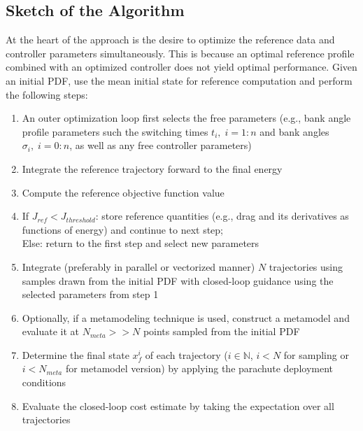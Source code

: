 \documentclass[10pt,a4paper]{article}
\begin{document}
	\subsection{Sketch of the Algorithm}
	At the heart of the approach is the desire to optimize the reference data and controller parameters simultaneously. This is because an optimal reference profile combined with an optimized controller does not yield optimal performance. Given an initial PDF, use the mean initial state for reference computation and perform the following steps:
	\begin{enumerate}
		\item An outer optimization loop first selects the free parameters (e.g., bank angle profile parameters such the switching times $t_i,\;i=1:n$ and bank angles $\sigma_i,\;i=0:n$, as well as any free controller parameters)
		\item Integrate the reference trajectory forward to the final energy
		\item Compute the reference objective function value
		\item If $ J_{ref} < J_{threshold} $: store reference quantities (e.g., drag and its derivatives as functions of energy) and continue to next step;\\
		Else: return to the first step and select new parameters
		\item Integrate (preferably in parallel or vectorized manner) $ N $ trajectories using samples drawn from the initial PDF with closed-loop guidance using the selected parameters from step 1
		\item Optionally, if a metamodeling technique is used, construct a metamodel and evaluate it at $N_{meta}>> N$ points sampled from the initial PDF
		\item Determine the final state $x^i_{f}$ of each trajectory ($i\in \mathbb{N}$, $i<N$ for sampling or $i < N_{meta}$ for metamodel version) by applying the parachute deployment conditions
		\item Evaluate the closed-loop cost estimate by taking the expectation over all trajectories
	\end{enumerate}
		
\end{document}
